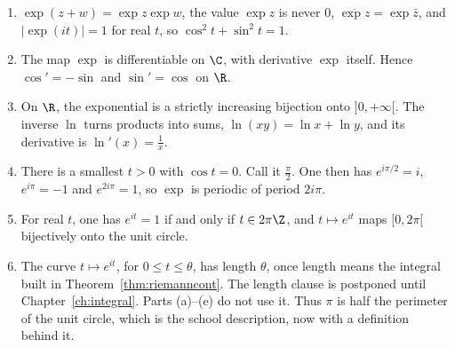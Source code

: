 \begin{theorem}\label{thm:exp}
\begin{enumerate}[label=(\alph*)]
\item $\exp(z+w)=\exp z\exp w$, the value $\exp z$ is never $0$, $\overline{\exp z}=\exp\bar z$, and $|\exp(it)|=1$ for real $t$, so $\cos^2t+\sin^2t=1$.
\item The map $\exp$ is differentiable on $\C$, with derivative $\exp$ itself. Hence $\cos'=-\sin$ and $\sin'=\cos$ on $\R$.
\item On $\R$, the exponential is a strictly increasing bijection onto $]0,+\infty[$. The inverse $\ln$ turns products into sums, $\ln(xy)=\ln x+\ln y$, and its derivative is $\ln'(x)=\frac1x$.
\item There is a smallest $t>0$ with $\cos t=0$. Call it $\frac\pi2$. One then has $e^{i\pi/2}=i$, $e^{i\pi}=-1$ and $e^{2i\pi}=1$, so $\exp$ is periodic of period $2i\pi$.
\item For real $t$, one has $e^{it}=1$ if and only if $t\in2\pi\Z$, and $t\mapsto e^{it}$ maps $[0,2\pi[$ bijectively onto the unit circle.
\item The curve $t\mapsto e^{it}$, for $0\le t\le\theta$, has length $\theta$, once length means the integral built in Theorem~\ref{thm:riemanncont}. The length clause is postponed until Chapter~\ref{ch:integral}. Parts (a)--(e) do not use it. Thus $\pi$ is half the perimeter of the unit circle, which is the school description, now with a definition behind it.
\end{enumerate}
\end{theorem}
